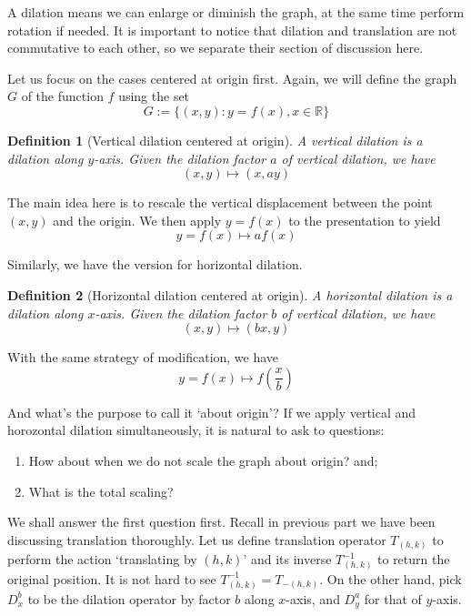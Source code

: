 \documentclass[12pt]{article}
\newtheorem{definition}{Definition}[section]
\begin{document}
    A dilation means we can enlarge or diminish the graph, at the same time perform rotation if needed. It is important to notice that dilation and translation are not commutative to each other, so we separate their section of discussion here.

    Let us focus on the cases centered at origin first. Again, we will define the graph $G$ of the function $f$ using the set \[G:=\{(x,y):y=f(x),x\in\mathbb{R}\}\]

    \begin{definition}[Vertical dilation centered at origin]
        A vertical dilation is a dilation along $y$-axis. Given the dilation factor $a$ of vertical dilation, we have \[(x,y)\mapsto(x,ay)\]
    \end{definition}

    The main idea here is to rescale the vertical displacement between the point $(x,y)$ and the origin. We then apply $y=f(x)$ to the presentation to yield \[y=f(x)\mapsto af(x)\]
    
    Similarly, we have the version for horizontal dilation.
    
    \begin{definition}[Horizontal dilation centered at origin]
        A horizontal dilation is a dilation along $x$-axis. Given the dilation factor $b$ of vertical dilation, we have \[(x,y)\mapsto(bx,y)\]
    \end{definition}

    With the same strategy of modification, we have \[y=f(x)\mapsto f(\frac{x}{b})\]

    And what's the purpose to call it `about origin'? If we apply vertical and horozontal dilation simultaneously, it is natural to ask to questions:\begin{enumerate}
        \item How about when we do not scale the graph about origin? and;
        \item What is the total scaling?
    \end{enumerate}

    We shall answer the first question first. Recall in previous part we have been discussing translation thoroughly. Let us define translation operator $T_{(h,k)}$ to perform the action `translating by $(h,k)$' and its inverse $T_{(h,k)}^{-1}$ to return the original position. It is not hard to see $T_{(h,k)}^{-1}=T_{-(h,k)}$. On the other hand, pick $D_x^b$ to be the dilation operator by factor $b$ along $x$-axis, and $D_y^a$ for that of $y$-axis. 
\end{document}

